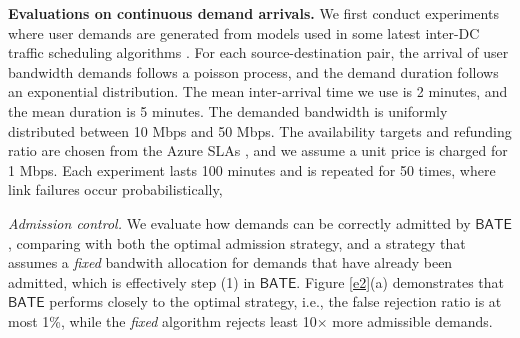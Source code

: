 \documentclass[sigconf]{acmart}
\begin{document}












%


\textbf{Evaluations on continuous demand arrivals.}
We first conduct experiments where user demands are generated from models used 
in some latest inter-DC traffic scheduling algorithms \cite{Guaranteeings,Online-deadline,OWAN,Teavar}. 
For each source-destination pair, the arrival of user bandwidth demands follows a poisson process, 
and the demand duration follows an exponential distribution.  
The mean inter-arrival time we use is 2 minutes, and the mean duration is 5 minutes. 
The demanded bandwidth is uniformly distributed between 10 Mbps and 50 Mbps.
The availability targets and refunding ratio are chosen from the Azure SLAs \cite{azure}, 
and we assume a unit price is charged for 1 Mbps. 
Each experiment lasts 100 minutes and is repeated for 50 times, 
where link failures occur probabilistically, 

\textit{Admission control.} We evaluate how demands can be correctly admitted by $\mathsf{BATE}$, 
comparing with both the optimal admission strategy, 
and a strategy that assumes a \textit{fixed} bandwith allocation for demands that have already been admitted, which is effectively step (1) in $\mathsf{BATE}$.
Figure \ref{e2}(a) demonstrates that $\mathsf{BATE}$ performs closely to the optimal strategy, 
i.e., the false rejection ratio is at most 1\%, while the \textit{fixed} algorithm 
rejects least 10$\times$ more admissible demands. 
\end{document}
